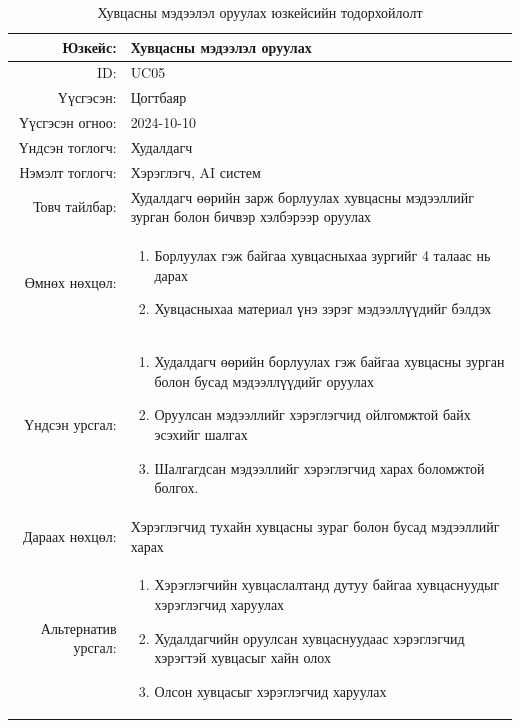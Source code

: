 \begin{longtable}{|r|p{11.5cm}|}
    \caption{Хувцасны мэдээлэл оруулах юзкейсийн тодорхойлолт} 
    \label{table:songolt3}\\ \hline
    {Юзкейс:} & {Хувцасны мэдээлэл оруулах}\\ \hline
    {ID:} & {UC05}\\ \hline
    {Үүсгэсэн:} & {Цогтбаяр}\\ \hline
    {Үүсгэсэн огноо:} & {2024-10-10}\\ \hline
    {Үндсэн тоглогч:} & {Худалдагч}\\ \hline
    {Нэмэлт тоглогч:} & {Хэрэглэгч, AI систем}\\ \hline
    {Товч тайлбар:} & {Худалдагч өөрийн зарж борлуулах хувцасны мэдээллийг зурган болон бичвэр хэлбэрээр оруулах}\\ \hline
    {Өмнөх нөхцөл:} & {\begin{enumerate}
        \item Борлуулах гэж байгаа хувцасныхаа зургийг 4 талаас нь дарах
        \item Хувцасныхаа материал үнэ зэрэг мэдээллүүдийг бэлдэх
    \end{enumerate}}\\ \hline
    {Үндсэн урсгал:} & {\begin{enumerate}
        \item Худалдагч өөрийн борлуулах гэж байгаа хувцасны зурган болон бусад мэдээллүүдийг оруулах
    \item Оруулсан мэдээллийг хэрэглэгчид ойлгомжтой байх эсэхийг шалгах
    \item Шалгагдсан мэдээллийг хэрэглэгчид харах боломжтой болгох.\end{enumerate}}\\ \hline
    {Дараах нөхцөл:} & {Хэрэглэгчид тухайн хувцасны зураг болон бусад мэдээллийг харах}\\ \hline
    {Альтернатив урсгал:} & {\begin{enumerate}
        \item Хэрэглэгчийн хувцаслалтанд дутуу байгаа хувцаснуудыг хэрэглэгчид харуулах
        \item Худалдагчийн оруулсан хувцаснуудаас хэрэглэгчид хэрэгтэй хувцасыг хайн олох
        \item Олсон хувцасыг хэрэглэгчид харуулах
    \end{enumerate}}\\ \hline
\end{longtable}
\newpage
